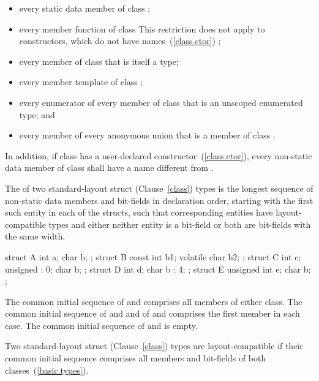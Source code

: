 \begin{itemize}
\item every static data member of class ;

\item every member function of class 
\enternote
This restriction does not apply to constructors, which do not have
names~(\ref{class.ctor})
\exitnote;

\item every member of class  that is itself a type;

\item every member template of class ;

\item every enumerator of every member of class  that is an
unscoped enumerated type; and

\item every member of every anonymous union that is a member of class
.
\end{itemize}

\pnum
In addition, if class  has a user-declared
constructor~(\ref{class.ctor}), every non-static data member of class
 shall have a name different from .

\pnum
The  of two standard-layout struct (Clause~\ref{class})
types is the longest sequence of non-static data
members and bit-fields in declaration order, starting with the first
such entity in each of the structs, such that corresponding entities
have layout-compatible types and either neither entity is a bit-field or
both are bit-fields with the same width.
\enterexample
\begin{codeblock}
  struct A { int a; char b; };
  struct B { const int b1; volatile char b2; };
  struct C { int c; unsigned : 0; char b; };
  struct D { int d; char b : 4; };
  struct E { unsigned int e; char b; };
\end{codeblock}
The common initial sequence of  and  comprises all members
of either class. The common initial sequence of  and  and
of  and  comprises the first member in each case.
The common initial sequence of  and  is empty.
\exitexample

\pnum
Two standard-layout struct (Clause~\ref{class}) types are layout-compatible if
their common initial sequence comprises all members and bit-fields of
both classes~(\ref{basic.types}).

